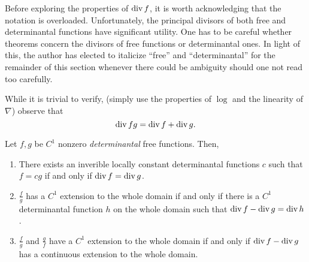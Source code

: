 Before exploring the properties of \(\operatorname{div} f\), it is worth acknowledging that
the notation is overloaded. Unfortunately, the principal divisors of both free
and determinantal functions have significant utility. One has to be careful
whether theorems concern the divisors of free functions or determinantal ones.
In light of this, the author has elected to italicize ``free'' and
``determinantal'' for the remainder of this section whenever there could be
ambiguity should one not read too carefully.

While it is trivial to verify, (simply use the properties of \(\log \) and the
linearity of \(\nabla\)) {\color{fgreen}} observe that
\[
  \operatorname{div} fg = \operatorname{div} f + \operatorname{div} g.
\]

\begin{lemma}%
\label{lem:ob21}
  Let \(f,g\) be \(C^1\) nonzero \emph{determinantal} free functions. Then,
  \begin{enumerate}
    \item There exists an inverible locally constant determinantal functions
          \(c\) such that \(f=cg\) if and only if \(\operatorname{div} f = \operatorname{div} g\).
    \item \(\frac{f}{g} \)  has a \(C^1\) extension to the whole domain if and
          only if there is a \(C^1\) determinantal function \(h\) on the whole
          domain such that \(\operatorname{div} f - \operatorname{div} g = \operatorname{div} h\).
    \item \(\frac{f}{g}\) and \(\frac{g}{f}\) have a \(C^1\) extension to the
          whole domain if and only if \(\operatorname{div} f - \operatorname{div} g\) has a continuous
          extension to the whole domain.
  \end{enumerate}
\end{lemma}
